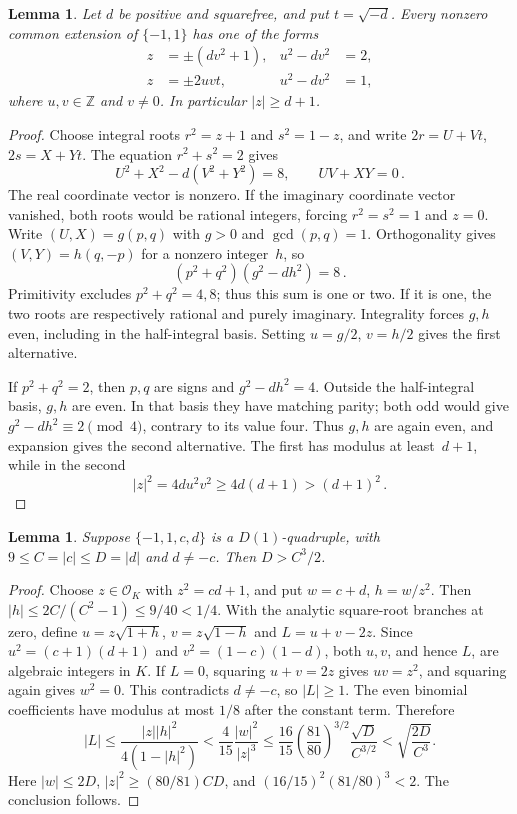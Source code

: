 \documentclass[12pt]{article}
\newtheorem{lemma}[theorem]{Lemma}
\newcommand{\OK}{\mathcal O_K}
\numberwithin{equation}{section}
\begin{document}
\begin{lemma}\label{sm:bs7-unit-axes}
Let $d$ be positive and squarefree, and put $t=\sqrt{-d}$. Every nonzero common extension of $\{-1,1\}$ has one of the forms
\begin{align*}
 z&=\pm(dv^2+1),& u^2-dv^2&=2,\\
 z&=\pm2uvt,& u^2-dv^2&=1,
\end{align*}
where $u,v\in\mathbb Z$ and $v\ne0$. In particular $|z|\ge d+1$.
\end{lemma}
\begin{proof}
Choose integral roots $r^2=z+1$ and $s^2=1-z$, and write $2r=U+Vt$, $2s=X+Yt$. The equation $r^2+s^2=2$ gives
\begin{equation*}
 U^2+X^2-d(V^2+Y^2)=8,\qquad UV+XY=0\,.
\end{equation*}
The real coordinate vector is nonzero. If the imaginary coordinate vector vanished, both roots would be rational integers, forcing $r^2=s^2=1$ and $z=0$. Write $(U,X)=g(p,q)$ with $g>0$ and $\gcd(p,q)=1$. Orthogonality gives $(V,Y)=h(q,-p)$ for a nonzero integer~$h$, so
\begin{equation*}
 (p^2+q^2)(g^2-dh^2)=8\,.
\end{equation*}
Primitivity excludes $p^2+q^2=4,8$; thus this sum is one or two. If it is one, the two roots are respectively rational and purely imaginary. Integrality forces $g,h$ even, including in the half-integral basis. Setting $u=g/2$, $v=h/2$ gives the first alternative.

If $p^2+q^2=2$, then $p,q$ are signs and $g^2-dh^2=4$. Outside the half-integral basis, $g,h$ are even. In that basis they have matching parity; both odd would give $g^2-dh^2\equiv2\pmod4$, contrary to its value four. Thus $g,h$ are again even, and expansion gives the second alternative. The first has modulus at least~$d+1$, while in the second
\begin{equation*}
 |z|^2=4du^2v^2\ge4d(d+1)>(d+1)^2\,.
\end{equation*}
\end{proof}

\begin{lemma}\label{sm:five-unit-cubic}
Suppose $\{-1,1,c,d\}$ is a $D(1)$-quadruple, with
$9\le C=|c|\le D=|d|$ and $d\ne-c$. Then $D>C^3/2$.
\end{lemma}
\begin{proof}
Choose $z\in\OK$ with $z^2=cd+1$, and put $w=c+d$, $h=w/z^2$.
Then $|h|\le2C/(C^2-1)\le9/40<1/4$.
With the analytic square-root branches at zero, define
$u=z\sqrt{1+h}$, $v=z\sqrt{1-h}$ and $L=u+v-2z$.
Since $u^2=(c+1)(d+1)$ and $v^2=(1-c)(1-d)$, both $u,v$,
and hence $L$, are algebraic integers in $K$.
If $L=0$, squaring $u+v=2z$ gives $uv=z^2$, and squaring again gives
$w^2=0$. This contradicts $d\ne-c$, so $|L|\ge1$.
The even binomial coefficients have modulus at most $1/8$ after the
constant term. Therefore
\[
 |L|\le\frac{|z||h|^2}{4(1-|h|^2)}
 <\frac4{15}\frac{|w|^2}{|z|^3}
 \le\frac{16}{15}\left(\frac{81}{80}\right)^{3/2}
       \frac{\sqrt D}{C^{3/2}}
 <\sqrt{\frac{2D}{C^3}}.
\]
Here $|w|\le2D$, $|z|^2\ge(80/81)CD$, and
$(16/15)^2(81/80)^3<2$. The conclusion follows.
\end{proof}
\end{document}
